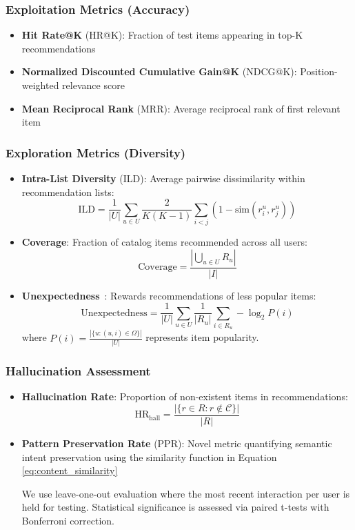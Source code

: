 \documentclass[acmsmall]{acmart}
\begin{document}
\subsubsection{Exploitation Metrics (Accuracy)}
\begin{itemize}
\item \textbf{Hit Rate@K} (HR@K): Fraction of test items appearing in top-K recommendations
\item \textbf{Normalized Discounted Cumulative Gain@K} (NDCG@K): Position-weighted relevance score
\item \textbf{Mean Reciprocal Rank} (MRR): Average reciprocal rank of first relevant item
\end{itemize}

\subsubsection{Exploration Metrics (Diversity)}
\begin{itemize}
\item \textbf{Intra-List Diversity} (ILD): Average pairwise dissimilarity within recommendation lists:
\begin{equation}
\text{ILD} = \frac{1}{|U|} \sum_{u \in U} \frac{2}{K(K-1)} \sum_{i<j} (1 - \text{sim}(r_i^u, r_j^u))
\end{equation}

\item \textbf{Coverage}: Fraction of catalog items recommended across all users:
\begin{equation}
\text{Coverage} = \frac{|\bigcup_{u \in U} R_u|}{|I|}
\end{equation}

\item \textbf{Unexpectedness}~\cite{ricci2022}: Rewards recommendations of less popular items:
\begin{equation}
\text{Unexpectedness} = \frac{1}{|U|} \sum_{u \in U} \frac{1}{|R_u|} \sum_{i \in R_u} -\log_2 P(i)
\end{equation}
where $P(i) = \frac{|\{u : (u,i) \in \Omega\}|}{|U|}$ represents item popularity.
\end{itemize}

\subsubsection{Hallucination Assessment}
\begin{itemize}
\item \textbf{Hallucination Rate}: Proportion of non-existent items in recommendations:
\begin{equation}
\text{HR}_{\text{hall}} = \frac{|\{r \in R : r \notin \mathcal{C}\}|}{|R|}
\end{equation}

\item \textbf{Pattern Preservation Rate} (PPR): Novel metric quantifying semantic intent preservation using the similarity function in Equation \ref{eq:content_similarity}

We use leave-one-out evaluation where the most recent interaction per user is held for testing. Statistical significance is assessed via paired t-tests with Bonferroni correction.
\end{itemize}
\end{document}
